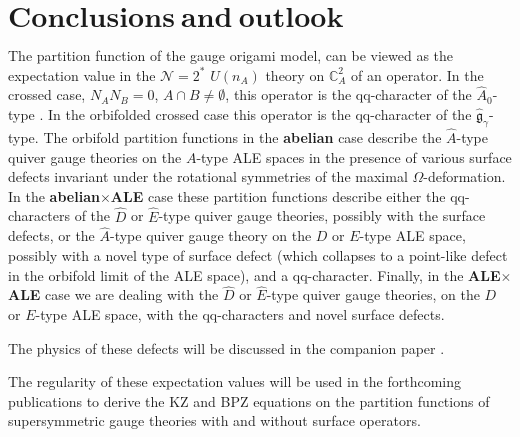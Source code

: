 \documentclass[12pt]{amsart}
\newcommand {\3}{\underline{\bf 3}}
\newcommand {\4}{\underline{\bf 4}}
\newcommand {\6}{\underline{\bf 6}}
\newcommand {\BC}   {\mathbb C}
\newcommand {\CalN} {\mathcal N}
\renewcommand{\hat}{\widehat}
\newcommand{\secc}[1]{\section{$\mathbf{ #1}$}}
\begin{document}
\secc{Conclusions\ and\ outlook}
 
The partition function of the gauge origami model,  can be viewed as
the expectation value in the ${\CalN}=2^{*}$ $U(n_{A})$ theory on ${\BC}^{2}_{A}$ of an operator. In the crossed case,  $N_{A}N_{B} = 0$, $A \cap B \neq {\emptyset}$, this operator is the qq-character of the ${\hat A}_{0}$-type \cite{Nekrasov:2015wsu}. In the orbifolded crossed case this operator is the qq-character of the ${\hat{\mathfrak g}}_{\gamma}$-type.  
 The orbifold partition functions in the {\bf abelian} case describe the ${\hat A}$-type quiver gauge theories on the $A$-type ALE spaces in the presence of various surface defects invariant under the rotational symmetries of the maximal $\Omega$-deformation. In the {\bf abelian}$\times${\bf ALE} case these partition functions describe either the qq-characters of the ${\hat D}$ or ${\hat E}$-type quiver gauge theories, possibly with the surface defects, or
 the ${\hat A}$-type quiver gauge theory on the $D$ or $E$-type ALE space, possibly with 
 a novel type of surface defect (which collapses to a point-like defect in the orbifold limit of the ALE space), and a qq-character. Finally, in the {\bf ALE}$\times${\bf ALE} case we are dealing with the  
 ${\hat D}$ or ${\hat E}$-type quiver gauge theories, on the $D$ or $E$-type ALE space, with the qq-characters and novel surface defects. 
 
 The physics of these defects will be discussed in the companion paper \cite{NeIV}. 
 
The regularity of these expectation values will be used in the forthcoming publications \cite{NeV, SX} to derive the KZ and BPZ  equations \cite{Belavin:1984vu, Knizhnik:1984} on the partition functions of supersymmetric gauge theories 
 with and without surface operators. 
\end{document}
